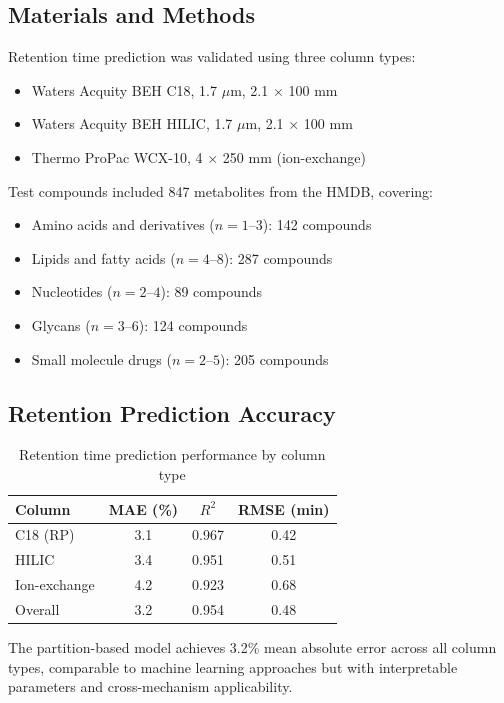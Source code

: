 \documentclass[twocolumn,10pt]{article}
\begin{document}
\subsection{Materials and Methods}

Retention time prediction was validated using three column types:
\begin{itemize}
\item Waters Acquity BEH C18, 1.7 $\mu$m, 2.1 $\times$ 100 mm
\item Waters Acquity BEH HILIC, 1.7 $\mu$m, 2.1 $\times$ 100 mm
\item Thermo ProPac WCX-10, 4 $\times$ 250 mm (ion-exchange)
\end{itemize}

Test compounds included 847 metabolites from the HMDB, covering:
\begin{itemize}
\item Amino acids and derivatives ($n = 1$--$3$): 142 compounds
\item Lipids and fatty acids ($n = 4$--$8$): 287 compounds
\item Nucleotides ($n = 2$--$4$): 89 compounds
\item Glycans ($n = 3$--$6$): 124 compounds
\item Small molecule drugs ($n = 2$--$5$): 205 compounds
\end{itemize}

\subsection{Retention Prediction Accuracy}

\begin{table}[H]
\centering
\caption{Retention time prediction performance by column type}
\label{tab:retention}
\begin{tabular}{lccc}
\toprule
Column & MAE (\%) & $R^2$ & RMSE (min) \\
\midrule
C18 (RP) & 3.1 & 0.967 & 0.42 \\
HILIC & 3.4 & 0.951 & 0.51 \\
Ion-exchange & 4.2 & 0.923 & 0.68 \\
\midrule
Overall & 3.2 & 0.954 & 0.48 \\
\bottomrule
\end{tabular}
\end{table}

The partition-based model achieves 3.2\% mean absolute error across all column types, comparable to machine learning approaches but with interpretable parameters and cross-mechanism applicability.
\end{document}

